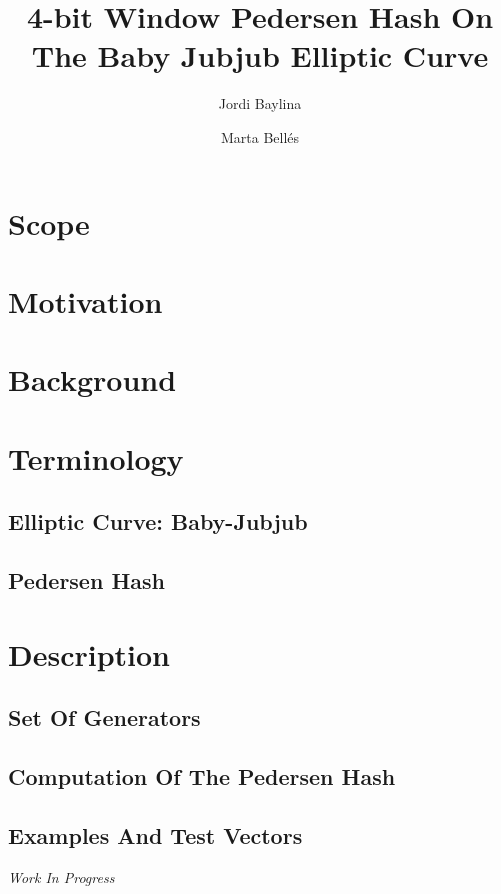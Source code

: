 \documentclass[11pt]{article}
\title{4-bit Window Pedersen Hash On The Baby Jubjub Elliptic Curve}
\author[1]{Jordi Baylina}
\author[1,2]{Marta Bellés}
\affil[1]{iden3}
\affil[2]{Universitat Pompeu Fabra}
\date{} %
\begin{document}
	{\maketitle}
	\vspace{-0.2cm}
	\tableofcontents
	
	
	\newpage

    \section{Scope}
        
	\section{Motivation}
        
    \section{Background}
        

	\section{Terminology}	
		\subsection{Elliptic Curve: Baby-Jubjub}
			
		\subsection{Pedersen Hash}
			
	
	\section{Description}
	
	\subsection{Set Of Generators}
		
		\subsection{Computation Of The Pedersen Hash}
		
		\label{sec-computation}
		\subsection{Examples And Test Vectors}
		\emph{Work In Progress}
		
\end{document}
